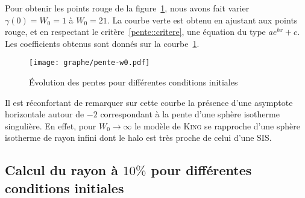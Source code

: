 	Pour obtenir les points rouge de la figure~\ref{coeff_evo}, nous avons fait varier $\gamma(0) = W_0 = 1$ à $W_0 = 21$.
	La courbe verte est obtenu en ajustant aux points rouge, et en respectant le critère~\ref{pente::critere}, une équation du type $a e^{b x} + c$. %
	Les coefficients obtenus sont donnés sur la courbe~\ref{coeff_evo}.
	\begin{figure}[hbt!]
		\centering \texttt{[image: graphe/pente-w0.pdf]}%
		\caption{Évolution des pentes pour différentes conditions initiales}
		\label{coeff_evo}
	\end{figure}

	Il est réconfortant de remarquer sur cette courbe la présence d'une asymptote horizontale autour de $-2$ correspondant à la pente d'une sphère isotherme singulière.
	En effet, pour $W_0 \to \infty$ le modèle de \textsc{King} se rapproche d'une sphère isotherme de rayon infini dont le halo est très proche de celui d'une SIS.

\subsection{Calcul du rayon à $10\%$ pour différentes conditions initiales\label{r_10}}

